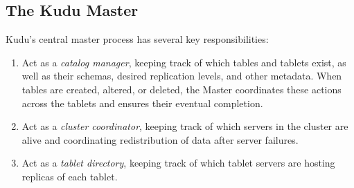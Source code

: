 \documentclass[twocolumn,9pt]{article}
\begin{document}

\subsection{The Kudu Master}

Kudu's central master process has several key responsibilities:
\begin{enumerate}
\item Act as a {\em catalog manager}, keeping track of which tables and tablets exist, as
well as their schemas, desired replication levels, and other metadata. When tables are created,
altered, or deleted, the Master coordinates these actions across the tablets and ensures
their eventual completion.
\item Act as a {\em cluster coordinator}, keeping track of which servers in the cluster
are alive and coordinating redistribution of data after server failures.
\item Act as a {\em tablet directory}, keeping track of which tablet servers are
hosting replicas of each tablet.
\end{enumerate}
\end{document}
